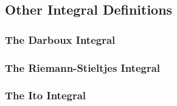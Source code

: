 \subsection{Other Integral Definitions} 

\subsubsection{The Darboux Integral}







\subsubsection{The Riemann-Stieltjes Integral}



\subsubsection{The Ito Integral}




